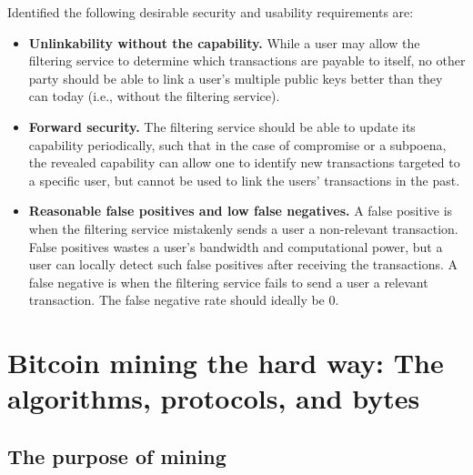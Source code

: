 Identified the following desirable security and usability requirements are:

\begin{itemize}
	\item \textbf{Unlinkability without the capability.} While a user may allow the filtering service
to determine which transactions are payable to itself, no other party should be able
to link a user’s multiple public keys better than they can today (i.e., without the
filtering service).
	\item \textbf{Forward security.} The filtering service should be able to update its capability periodically,
such that in the case of compromise or a subpoena, the revealed capability
can allow one to identify new transactions targeted to a specific user, but cannot be
used to link the users’ transactions in the past.
	\item \textbf{Reasonable false positives and low false negatives.} A false positive is when the
filtering service mistakenly sends a user a non-relevant transaction. False positives
wastes a user’s bandwidth and computational power, but a user can locally detect
such false positives after receiving the transactions. A false negative is when the
filtering service fails to send a user a relevant transaction. The false negative rate
should ideally be 0.
\end{itemize}



\chapter{Bitcoin mining the hard way: The algorithms, protocols, and bytes}
\section{The purpose of mining}

